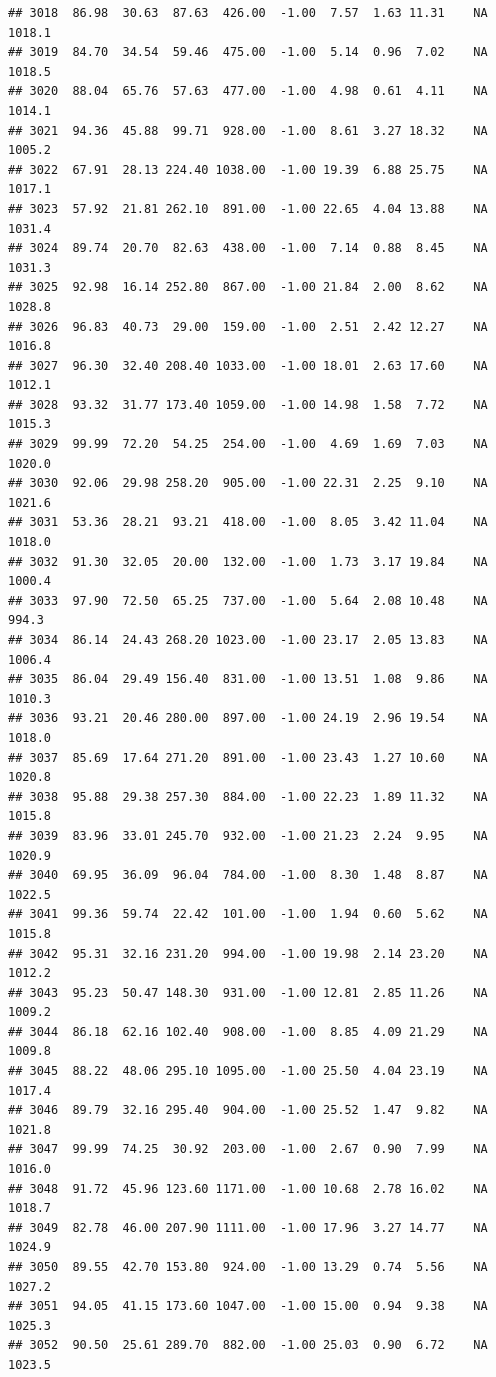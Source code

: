 \documentclass{article}\usepackage{graphicx, color}
\makeatletter
\newenvironment{kframe}{%
 \def\at@end@of@kframe{}%
 \ifinner\ifhmode%
  \def\at@end@of@kframe{\end{minipage}}%
  \begin{minipage}{\columnwidth}%
 \fi\fi%
 \def\FrameCommand##1{\hskip\@totalleftmargin \hskip-\fboxsep
 \colorbox{shadecolor}{##1}\hskip-\fboxsep
     \hskip-\linewidth \hskip-\@totalleftmargin \hskip\columnwidth}%
 \MakeFramed {\advance\hsize-\width
   \@totalleftmargin\z@ \linewidth\hsize
   \@setminipage}}%
 {\par\unskip\endMakeFramed%
 \at@end@of@kframe}
\newenvironment{knitrout}{}{} %
\makeatother
\begin{document}
\begin{knitrout}
\begin{kframe}
\begin{verbatim}
## 3018  86.98  30.63  87.63  426.00  -1.00  7.57  1.63 11.31    NA 1018.1
## 3019  84.70  34.54  59.46  475.00  -1.00  5.14  0.96  7.02    NA 1018.5
## 3020  88.04  65.76  57.63  477.00  -1.00  4.98  0.61  4.11    NA 1014.1
## 3021  94.36  45.88  99.71  928.00  -1.00  8.61  3.27 18.32    NA 1005.2
## 3022  67.91  28.13 224.40 1038.00  -1.00 19.39  6.88 25.75    NA 1017.1
## 3023  57.92  21.81 262.10  891.00  -1.00 22.65  4.04 13.88    NA 1031.4
## 3024  89.74  20.70  82.63  438.00  -1.00  7.14  0.88  8.45    NA 1031.3
## 3025  92.98  16.14 252.80  867.00  -1.00 21.84  2.00  8.62    NA 1028.8
## 3026  96.83  40.73  29.00  159.00  -1.00  2.51  2.42 12.27    NA 1016.8
## 3027  96.30  32.40 208.40 1033.00  -1.00 18.01  2.63 17.60    NA 1012.1
## 3028  93.32  31.77 173.40 1059.00  -1.00 14.98  1.58  7.72    NA 1015.3
## 3029  99.99  72.20  54.25  254.00  -1.00  4.69  1.69  7.03    NA 1020.0
## 3030  92.06  29.98 258.20  905.00  -1.00 22.31  2.25  9.10    NA 1021.6
## 3031  53.36  28.21  93.21  418.00  -1.00  8.05  3.42 11.04    NA 1018.0
## 3032  91.30  32.05  20.00  132.00  -1.00  1.73  3.17 19.84    NA 1000.4
## 3033  97.90  72.50  65.25  737.00  -1.00  5.64  2.08 10.48    NA  994.3
## 3034  86.14  24.43 268.20 1023.00  -1.00 23.17  2.05 13.83    NA 1006.4
## 3035  86.04  29.49 156.40  831.00  -1.00 13.51  1.08  9.86    NA 1010.3
## 3036  93.21  20.46 280.00  897.00  -1.00 24.19  2.96 19.54    NA 1018.0
## 3037  85.69  17.64 271.20  891.00  -1.00 23.43  1.27 10.60    NA 1020.8
## 3038  95.88  29.38 257.30  884.00  -1.00 22.23  1.89 11.32    NA 1015.8
## 3039  83.96  33.01 245.70  932.00  -1.00 21.23  2.24  9.95    NA 1020.9
## 3040  69.95  36.09  96.04  784.00  -1.00  8.30  1.48  8.87    NA 1022.5
## 3041  99.36  59.74  22.42  101.00  -1.00  1.94  0.60  5.62    NA 1015.8
## 3042  95.31  32.16 231.20  994.00  -1.00 19.98  2.14 23.20    NA 1012.2
## 3043  95.23  50.47 148.30  931.00  -1.00 12.81  2.85 11.26    NA 1009.2
## 3044  86.18  62.16 102.40  908.00  -1.00  8.85  4.09 21.29    NA 1009.8
## 3045  88.22  48.06 295.10 1095.00  -1.00 25.50  4.04 23.19    NA 1017.4
## 3046  89.79  32.16 295.40  904.00  -1.00 25.52  1.47  9.82    NA 1021.8
## 3047  99.99  74.25  30.92  203.00  -1.00  2.67  0.90  7.99    NA 1016.0
## 3048  91.72  45.96 123.60 1171.00  -1.00 10.68  2.78 16.02    NA 1018.7
## 3049  82.78  46.00 207.90 1111.00  -1.00 17.96  3.27 14.77    NA 1024.9
## 3050  89.55  42.70 153.80  924.00  -1.00 13.29  0.74  5.56    NA 1027.2
## 3051  94.05  41.15 173.60 1047.00  -1.00 15.00  0.94  9.38    NA 1025.3
## 3052  90.50  25.61 289.70  882.00  -1.00 25.03  0.90  6.72    NA 1023.5

\end{verbatim}
\end{kframe}
\end{knitrout}
\end{document}
